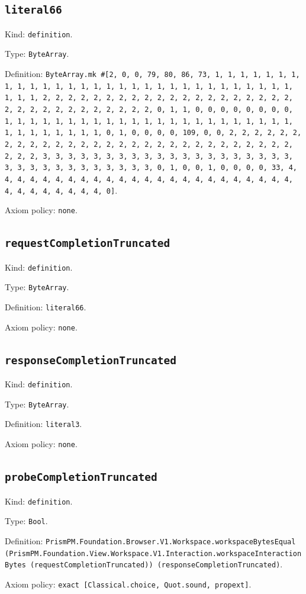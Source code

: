 \documentclass[11pt]{article}
\begin{document}
\subsection*{\texttt{literal66}}
\noindent Kind: \texttt{definition}.\par
\noindent Type: \texttt{ByteArray}.\par
\noindent Definition: \texttt{ByteArray.mk \#[2, 0, 0, 79, 80, 86, 73, 1, 1, 1, 1, 1, 1, 1, 1, 1, 1, 1, 1, 1, 1, 1, 1, 1, 1, 1, 1, 1, 1, 1, 1, 1, 1, 1, 1, 1, 1, 1, 1, 1, 2, 2, 2, 2, 2, 2, 2, 2, 2, 2, 2, 2, 2, 2, 2, 2, 2, 2, 2, 2, 2, 2, 2, 2, 2, 2, 2, 2, 2, 2, 2, 2, 0, 1, 1, 0, 0, 0, 0, 0, 0, 0, 0, 1, 1, 1, 1, 1, 1, 1, 1, 1, 1, 1, 1, 1, 1, 1, 1, 1, 1, 1, 1, 1, 1, 1, 1, 1, 1, 1, 1, 1, 1, 1, 0, 1, 0, 0, 0, 0, 109, 0, 0, 2, 2, 2, 2, 2, 2, 2, 2, 2, 2, 2, 2, 2, 2, 2, 2, 2, 2, 2, 2, 2, 2, 2, 2, 2, 2, 2, 2, 2, 2, 2, 2, 3, 3, 3, 3, 3, 3, 3, 3, 3, 3, 3, 3, 3, 3, 3, 3, 3, 3, 3, 3, 3, 3, 3, 3, 3, 3, 3, 3, 3, 3, 3, 3, 0, 1, 0, 0, 1, 0, 0, 0, 0, 33, 4, 4, 4, 4, 4, 4, 4, 4, 4, 4, 4, 4, 4, 4, 4, 4, 4, 4, 4, 4, 4, 4, 4, 4, 4, 4, 4, 4, 4, 4, 4, 4, 0]}.\par
\noindent Axiom policy: \texttt{none}.\par
\subsection*{\texttt{requestCompletionTruncated}}
\noindent Kind: \texttt{definition}.\par
\noindent Type: \texttt{ByteArray}.\par
\noindent Definition: \texttt{literal66}.\par
\noindent Axiom policy: \texttt{none}.\par
\subsection*{\texttt{responseCompletionTruncated}}
\noindent Kind: \texttt{definition}.\par
\noindent Type: \texttt{ByteArray}.\par
\noindent Definition: \texttt{literal3}.\par
\noindent Axiom policy: \texttt{none}.\par
\subsection*{\texttt{probeCompletionTruncated}}
\noindent Kind: \texttt{definition}.\par
\noindent Type: \texttt{Bool}.\par
\noindent Definition: \texttt{PrismPM.Foundation.Browser.V1.Workspace.workspaceBytesEqual (PrismPM.Foundation.View.Workspace.V1.Interaction.workspaceInteractionBytes (requestCompletionTruncated)) (responseCompletionTruncated)}.\par
\noindent Axiom policy: \texttt{exact [Classical.choice, Quot.sound, propext]}.\par
\end{document}
